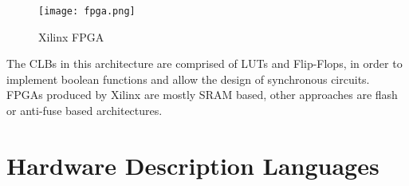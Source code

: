 \begin{figure}[h]
\centering
\texttt{[image: fpga.png]}
\caption{Xilinx FPGA \cite{xilinx:2017}}
\label{fig:FPGA}
\end{figure}

The CLBs in this architecture are comprised of LUTs and Flip-Flops, in order to implement boolean functions and allow the design of synchronous circuits. FPGAs produced by Xilinx are mostly SRAM based, other approaches are flash or anti-fuse based architectures.

\section{Hardware Description Languages}


